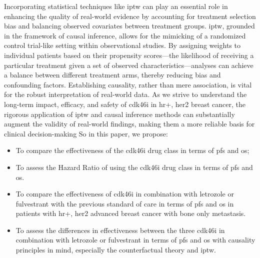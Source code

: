 Incorporating statistical techniques like \ac{iptw} can play an essential role in enhancing the quality of real-world evidence by accounting for treatment selection bias and balancing observed covariates between treatment groups. \ac{iptw}, grounded in the framework of causal inference, allows for the mimicking of a randomized control trial-like setting within observational studies. By assigning weights to individual patients based on their propensity scores—the likelihood of receiving a particular treatment given a set of observed characteristics—analyses can achieve a balance between different treatment arms, thereby reducing bias and confounding factors. Establishing causality, rather than mere association, is vital for the robust interpretation of real-world data. As we strive to understand the long-term impact, efficacy, and safety of \ac{cdk46i} in \ac{hr+}, \ac{her2} breast cancer, the rigorous application of \ac{iptw} and causal inference methods can substantially augment the validity of real-world findings, making them a more reliable basis for clinical decision-making \cite{austinIntroductionPropensityScore2011,austinUsePropensityScore2014}
So in this paper, we propose:
\begin{itemize}
    \item To compare the effectiveness of the \ac{cdk46i} drug class in terms of  \ac{pfs}  and  \ac{os};

    \item To assess the Hazard Ratio of using the \ac{cdk46i} drug class in terms of \ac{pfs} and \ac{os}.
    
    \item  To compare the effectiveness of \ac{cdk46i} in combination with letrozole or fulvestrant with the previous standard of care in terms of \ac{pfs} and \ac{os} in patients with \ac{hr+}, \ac{her2} advanced breast cancer with bone only metastasis.

    \item To assess the differences in effectiveness between the three \ac{cdk46i} in combination with letrozole or fulvestrant in terms of \ac{pfs} and \ac{os} with causality principles in mind, especially the counterfactual theory and \ac{iptw}.
    
\end{itemize}
